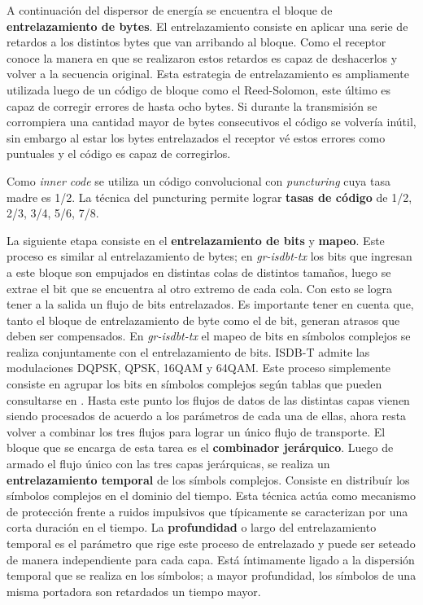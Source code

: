 \documentclass[journal,comsoc]{IEEEtran}
\begin{document}
A continuación del dispersor de energía se encuentra el bloque de \textbf{entrelazamiento de bytes}. El entrelazamiento consiste en aplicar una serie de retardos a los distintos bytes que van arribando al bloque. Como el receptor conoce la manera en que se realizaron estos retardos es capaz de deshacerlos y volver a la secuencia original. Esta estrategia de entrelazamiento es ampliamente utilizada luego de un código de bloque como el Reed-Solomon, este último es capaz de corregir errores de hasta ocho bytes. Si durante la transmisión se corrompiera una cantidad mayor de bytes consecutivos el código se volvería inútil, sin embargo al estar los bytes entrelazados el receptor vé estos errores como puntuales y el código es capaz de corregirlos.

Como \textit{inner code} se utiliza un código convolucional con \textit{puncturing} cuya tasa madre es 1/2. La técnica del puncturing permite lograr \textbf{tasas de código} de 1/2, 2/3, 3/4, 5/6, 7/8.

La siguiente etapa consiste en el \textbf{entrelazamiento de bits} y \textbf{mapeo}. Este proceso es similar al entrelazamiento de bytes; en \textit{gr-isdbt-tx} los bits que ingresan a este bloque son empujados en distintas colas de distintos tamaños, luego se extrae el bit que se encuentra al otro extremo de cada cola. Con esto se logra tener a la salida un flujo de bits entrelazados. Es importante tener en cuenta que, tanto el bloque de entrelazamiento de byte como el de bit, generan atrasos que deben ser compensados.
En \textit{gr-isdbt-tx} el mapeo de bits en símbolos complejos se realiza conjuntamente con el entrelazamiento de bits. ISDB-T admite las modulaciones DQPSK, QPSK, 16QAM y 64QAM. Este proceso simplemente consiste en agrupar los bits en símbolos complejos según tablas que pueden consultarse en \cite{norma}.
Hasta este punto los flujos de datos de las distintas capas vienen siendo procesados de acuerdo a los parámetros de cada una de ellas, ahora resta volver a combinar los tres flujos para lograr un único flujo de transporte. El bloque que se encarga de esta tarea es el \textbf{combinador jerárquico}.
Luego de armado el flujo único con las tres capas jerárquicas, se realiza un \textbf{entrelazamiento temporal} de los símbols complejos. Consiste en distribuír los símbolos complejos en el dominio del tiempo. Esta técnica actúa como mecanismo de protección frente a ruidos impulsivos que típicamente se caracterizan por una corta duración en el tiempo. La \textbf{profundidad} o largo del entrelazamiento temporal es el parámetro que rige este proceso de entrelazado y puede ser seteado de manera independiente para cada capa. Está íntimamente ligado a la dispersión temporal que se realiza en los símbolos; a mayor profundidad, los símbolos de una misma portadora son retardados un tiempo mayor.
\end{document}

